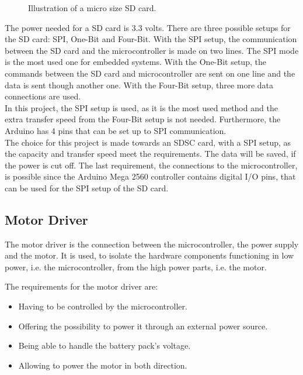 \begin{minipage}{\linewidth}
\begin{minipage}{0.30\linewidth}
\begin{figure}[H]
              \caption{Illustration of a micro size SD card.} %
              \label{SDcardpinout}
          \end{figure}
      \end{minipage}
      
  \end{minipage}

The power needed for a SD card is 3.3 volts. There are three possible setups for the SD card: SPI, One-Bit and Four-Bit.
With the SPI setup, the communication between the SD card and the microcontroller is made on two lines. The SPI mode is the most used one for embedded systems.
With the One-Bit setup, the commands between the SD card and microcontroller are sent on one line and the data is sent though another one.
With the Four-Bit setup, three more data connections are used.\\
%
In this project, the SPI setup is used, as it is the most used method and the extra transfer speed from the Four-Bit setup is not needed. Furthermore, the Arduino has 4 pins that can be set up to SPI communication.\\

The choice for this project is made towards an SDSC card, with a SPI setup, as the capacity and transfer speed meet the requirements. The data will be saved, if the power is cut off. The last requirement, the connections to the microcontroller, is possible since the Arduino Mega 2560 controller contains digital I/O pins, that can be used for the SPI setup of the SD card.



\subsection{Motor Driver}
The motor driver is the connection between the microcontroller, the power supply and the motor. It is used, to isolate the hardware components functioning in low power, i.e. the microcontroller, from the high power parts, i.e. the motor.

The requirements for the motor driver are:
\begin{itemize}
\item Having to be controlled by the microcontroller.
\item Offering the possibility to power it through an external power source.
\item Being able to handle the battery pack's voltage.
\item Allowing to power the motor in both direction.
\end{itemize}

